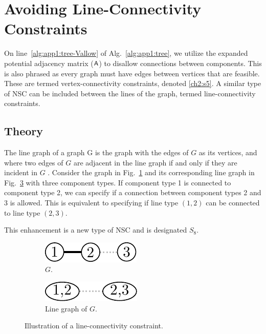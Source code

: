 \section{Avoiding Line-Connectivity Constraints\label{sec:app1:lines}}

On line~\ref{alg:app1:tree-Vallow} of Alg.~\ref{alg:app1:tree}, we utilize the expanded potential adjacency matrix ($\textup{\textsf{A}}$) to disallow connections between components. This is also phrased as every graph must have edges between vertices that are feasible. These are termed vertex-connectivity constraints, denoted \ref{ch2:s5}. A similar type of NSC can be included between the lines of the graph, termed line-connectivity constraints.

\subsection{Theory}

The line graph of a graph \gls{G} is the graph with the edges of $G$ as its vertices, and where two edges of $G$ are adjacent in the line graph if and only if they are incident in $G$ \cite[p.~10]{Godsil2001a}.
Consider the graph in Fig.~\ref{fig:app1:line-connectivity-1} and its corresponding line graph in Fig.~\ref{fig:app1:line-connectivity-2} with three component types.
If component type 1 is connected to component type 2, we can specify if a connection between component types 2 and 3 is allowed. This is equivalent to specifying if line type $(1,2)$ can be connected to line type $(2,3)$.

This enhancement is a new type of NSC and is designated $S_8$.

\begin{figure}[!ht]
\centering
\begin{subfigure}[b]{0.35\textwidth}
\centering
\includegraphics[scale=1]{../app1/fig/line-connectivity-1}
\caption{$G$.\label{fig:app1:line-connectivity-1}}
\end{subfigure}%
\begin{subfigure}[b]{0.35\textwidth}
\centering
 \includegraphics[scale=1]{../app1/fig/line-connectivity-2}
 \caption{Line graph of $G$.\label{fig:app1:line-connectivity-2}}
\end{subfigure}%

\caption{Illustration of a line-connectivity constraint.}
\end{figure}

